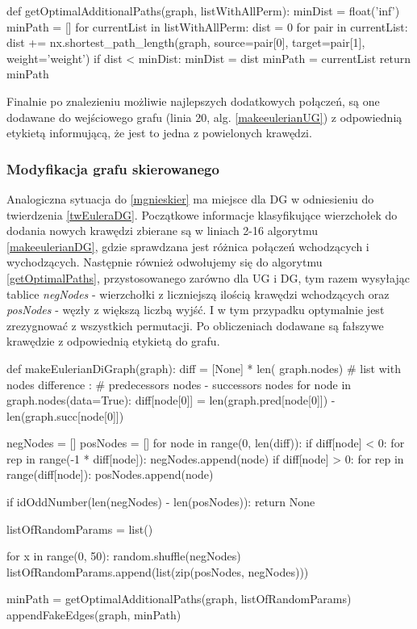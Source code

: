 \documentclass[a4paper, 12pt, twoside, openright]{article}
\begin{document}
\begin{algorithm}[caption={\textit{getOptimalAdditionalPaths} funkcja obliczająca i zwracająca najlepsze pary wierzchołków do połączenia, dla \textit{makeEulerianGraph} i \textit{makeEulerianDiGraph}}, label={getOptimalPaths}]
def getOptimalAdditionalPaths(graph, listWithAllPerm):
	minDist = float('inf')
	minPath = []
	for currentList in listWithAllPerm:
		dist = 0
		for pair in currentList:
			dist += nx.shortest_path_length(graph, source=pair[0], 
			target=pair[1], weight='weight')
		if dist < minDist:
			minDist = dist
			minPath = currentList
	return minPath
\end{algorithm}

	Finalnie po znalezieniu możliwie najlepszych dodatkowych połączeń, są one dodawane do wejściowego grafu (linia 20, alg. \ref{makeeulerianUG}) z odpowiednią etykietą informującą, że jest to jedna z powielonych krawędzi.


\subsubsection{Modyfikacja grafu skierowanego} \label{modSkier}
\indent\par
	Analogiczna sytuacja do \ref{mgnieskier} ma miejsce dla DG w odniesieniu do twierdzenia \ref{twEuleraDG}. Początkowe informacje klasyfikujące wierzchołek do dodania nowych krawędzi zbierane są w liniach 2-16 algorytmu \ref{makeeulerianDG}, gdzie sprawdzana jest różnica połączeń wchodzących i wychodzących. Następnie również odwołujemy się do algorytmu \ref{getOptimalPaths}, przystosowanego zarówno dla UG i DG, tym razem wysyłając tablice \textit{negNodes} - wierzchołki z liczniejszą ilością krawędzi wchodzących oraz \textit{posNodes} - węzły z większą liczbą wyjść. I w tym przypadku optymalnie jest zrezygnować z wszystkich permutacji. Po  obliczeniach dodawane są fałszywe krawędzie z odpowiednią etykietą do grafu.
	
\begin{algorithm}[caption={\textit{makeEulerianDiGraph} przekształcający graf skierowany do grafu Eulera}, label={makeeulerianDG}]
def makeEulerianDiGraph(graph):
	diff = [None] * len(
			graph.nodes)  # list with nodes difference : 
			    	      # predecessors nodes - successors nodes
	for node in graph.nodes(data=True):
		diff[node[0]] = len(graph.pred[node[0]]) - len(graph.succ[node[0]])
	
	negNodes = []
	posNodes = []
	for node in range(0, len(diff)):
		if diff[node] < 0:
			for rep in range(-1 * diff[node]):
				negNodes.append(node)
		if diff[node] > 0:
			for rep in range(diff[node]):
				posNodes.append(node)
	
	if idOddNumber(len(negNodes) - len(posNodes)):
		return None
	
	listOfRandomParams = list()
	
	for x in range(0, 50):
		random.shuffle(negNodes)
		listOfRandomParams.append(list(zip(posNodes, negNodes)))
	
	minPath = getOptimalAdditionalPaths(graph, listOfRandomParams)
	appendFakeEdges(graph, minPath)   
\end{algorithm}
\end{document}
